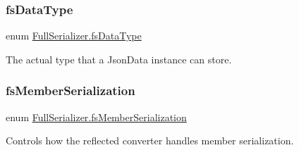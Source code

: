 \subsubsection{\texorpdfstring{fs\+Data\+Type}{fsDataType}}
{\footnotesize\ttfamily enum \hyperlink{namespace_full_serializer_a6eee33d63b94e40fdfcfc59af9fcfc82}{Full\+Serializer.\+fs\+Data\+Type}\hspace{0.3cm}{\ttfamily [strong]}}



The actual type that a Json\+Data instance can store. 

\mbox{\label{namespace_full_serializer_ad0dc98cd54a3d07f8c579d82585906f8}} 
\subsubsection{\texorpdfstring{fs\+Member\+Serialization}{fsMemberSerialization}}
{\footnotesize\ttfamily enum \hyperlink{namespace_full_serializer_ad0dc98cd54a3d07f8c579d82585906f8}{Full\+Serializer.\+fs\+Member\+Serialization}\hspace{0.3cm}{\ttfamily [strong]}}



Controls how the reflected converter handles member serialization. 

